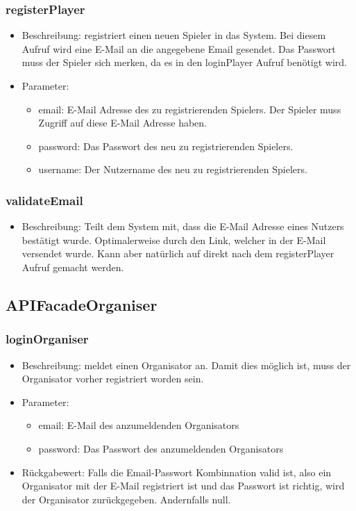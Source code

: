 \documentclass[a4paper]{scrreprt}
\begin{document}
    \subsubsection{registerPlayer}
    \begin{itemize}
        \item Beschreibung: registriert einen neuen Spieler in das System. Bei diesem Aufruf wird eine E-Mail an die angegebene Email gesendet. Das Passwort muss der Spieler sich merken, da es in den loginPlayer Aufruf benötigt wird.
        \item Parameter:
        \begin{itemize}
            \item email: E-Mail Adresse des zu registrierenden Spielers. Der Spieler muss Zugriff auf diese E-Mail Adresse haben.
            \item password: Das Passwort des neu zu registrierenden Spielers.
            \item username: Der Nutzername des neu zu registrierenden Spielers.
        \end{itemize}
    \end{itemize}
    \subsubsection{validateEmail}
    \begin{itemize}
        \item Beschreibung: Teilt dem System mit, dass die E-Mail Adresse eines Nutzers bestätigt wurde. Optimalerweise durch den Link, welcher in der E-Mail versendet wurde. Kann aber natürlich auf direkt nach dem registerPlayer Aufruf gemacht werden.
    \end{itemize}
	\subsection{APIFacadeOrganiser}
	\subsubsection{loginOrganiser}
	\begin{itemize}
		\item Beschreibung: meldet einen Organisator an. Damit dies möglich ist, muss der Organisator vorher registriert worden sein.
		\item Parameter:
		\begin{itemize}
			\item email: E-Mail des anzumeldenden Organisators
			\item password: Das Passwort des anzumeldenden Organisators
		\end{itemize}
		\item Rückgabewert: Falls die Email-Passwort Kombinnation valid ist, also ein Organisator mit der E-Mail registriert ist und das Passwort ist richtig, wird der Organisator zurückgegeben. Andernfalls null. 
	\end{itemize}
\end{document}
